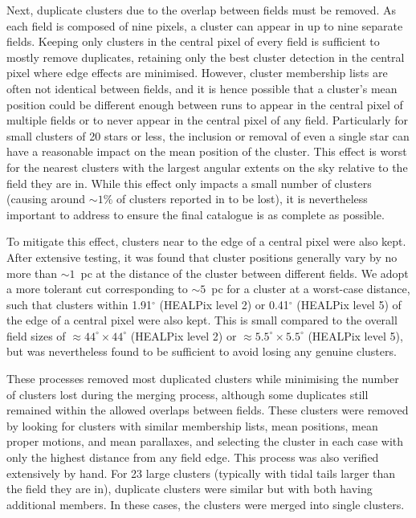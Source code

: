 Next, duplicate clusters due to the overlap between fields must be removed. As each field is composed of nine pixels, a cluster can appear in up to nine separate fields. Keeping only clusters in the central pixel of every field is sufficient to mostly remove duplicates, retaining only the best cluster detection in the central pixel where edge effects are minimised. However, cluster membership lists are often not identical between fields, and it is hence possible that a cluster's mean position could be different enough between runs to appear in the central pixel of multiple fields or to never appear in the central pixel of any field. Particularly for small clusters of 20 stars or less, the inclusion or removal of even a single star can have a reasonable impact on the mean position of the cluster. This effect is worst for the nearest clusters with the largest angular extents on the sky relative to the field they are in. While this effect only impacts a small number of clusters (causing around $\sim1\%$ of clusters reported in \cite{cantat-gaudin_clusters_2020} to be lost), it is nevertheless important to address to ensure the final catalogue is as complete as possible.

To mitigate this effect, clusters near to the edge of a central pixel were also kept. After extensive testing, it was found that cluster positions generally vary by no more than $\sim 1$~pc at the distance of the cluster between different fields. We adopt a more tolerant cut corresponding to $\sim 5$~pc for a cluster at a worst-case distance, such that clusters within 1.91$^\circ$ (HEALPix level 2) or 0.41$^\circ$ (HEALPix level 5) of the edge of a central pixel were also kept. This is small compared to the overall field sizes of $\approx44^\circ \times 44^\circ$ (HEALPix level 2) or $\approx5.5^\circ \times 5.5^\circ$ (HEALPix level 5), but was nevertheless found to be sufficient to avoid losing any genuine clusters.

These processes removed most duplicated clusters while minimising the number of clusters lost during the merging process, although some duplicates still remained within the allowed overlaps between fields. These clusters were removed by looking for clusters with similar membership lists, mean positions, mean proper motions, and mean parallaxes, and selecting the cluster in each case with only the highest distance from any field edge. This process was also verified extensively by hand. For 23 large clusters (typically with tidal tails larger than the field they are in), duplicate clusters were similar but with both having additional members. In these cases, the clusters were merged into single clusters.

